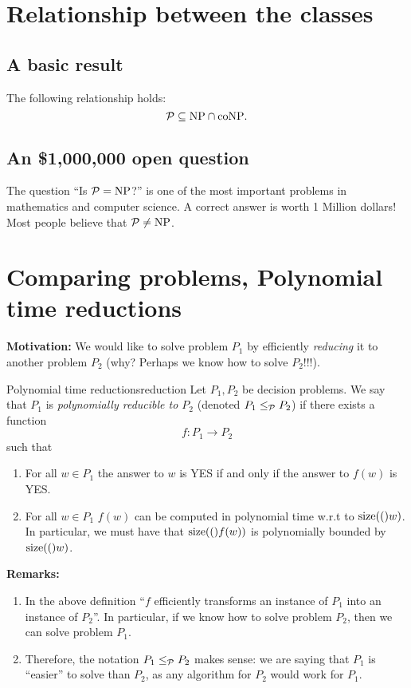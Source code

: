 \section{Relationship between the classes}
\subsection{A basic result}
 
\begin{theorem}{}{} The following relationship holds:
 $${\mathcal{P}}\subseteq \mbox{NP}\cap\mbox{coNP}.$$
\end{theorem}

\subsection{An \$1,000,000 open question}
 The question ``Is ${\mathcal{P}}=\mbox{NP}$?'' is one of the most important problems in mathematics and computer science. A correct answer is worth 1 Million dollars! Most people believe that ${\mathcal{P}}\neq \mbox{NP}$.

 \section{Comparing problems, Polynomial time reductions}

{\bf Motivation:} We would like to solve problem $P_1$ by efficiently {\em reducing} it to another problem $P_2$ (why? Perhaps we know how to solve $P_2$!!!).

	\begin{definition}{Polynomial time reductions}{reduction}
Let $P_1,P_2$ be decision problems. We say that $P_1$ is {\em polynomially reducible to $P_2$} (denoted $P_1\leq_{{\mathcal{P}}}P_2$) if there exists a function
$$f:P_1\rightarrow P_2$$
such that 
\begin{enumerate}
	\item For all $w\in P_1$ the answer to $w$ is YES if and only if the answer to $f(w)$ is YES.
	\item For all $w\in P_1$ $f(w)$ can be computed in polynomial time w.r.t to $\mathrm{size}(()w)$. In particular, we must have that $\mathrm{size}(()f(w))$ is polynomially bounded by $\mathrm{size}(()w)$.
\end{enumerate}
\end{definition}

{\bf Remarks:} \begin{enumerate}
	\item In the above definition ``$f$ efficiently transforms an instance of $P_1$ into an instance of $P_2$''. In particular, if we know how to solve problem $P_2$, then we can solve problem $P_1$.
	\item Therefore, the notation $P_1\leq_{{\mathcal{P}}}P_2$ makes sense: we are saying that $P_1$ is ``easier'' to solve than $P_2$, as any algorithm for $P_2$ would work for $P_1$. 
\end{enumerate} 



